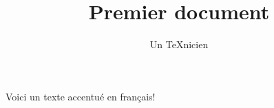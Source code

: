 \documentclass{article}
\title{Premier document}
\author{Un TeXnicien}
\date{}
\begin{document}
\maketitle
Voici un texte accentué en français!
\end{document}

